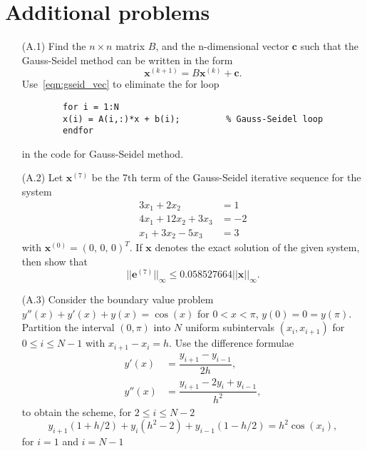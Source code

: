 \documentclass[11pt,a4paper,reqno]{article}
\begin{document}
\section{Additional problems}
\begin{itemize}
	\item[(A.1)] Find the $n \times n$ matrix $B$, and the n-dimensional vector ${\pmb c}$ such that the Gauss-Seidel method can be written in the form
	\begin{equation}
	{\pmb x}^{(k+1)} = B{\pmb x}^{(k)} + {\pmb c}.
	\label{eqn:gseid_vec}
	\end{equation} 
	Use~\eqref{eqn:gseid_vec} to eliminate the for loop 
	\begin{mdframed}[style=cframe,nobreak=true,align=center]
		\begin{verbatim}
		for i = 1:N
		x(i) = A(i,:)*x + b(i);         % Gauss-Seidel loop
		endfor
		\end{verbatim}
	\end{mdframed}
in the code for Gauss-Seidel method.
\item[(A.2)] Let ${\pmb x}^{(7)}$ be the 7$\text{th}$ term of the Gauss-Seidel iterative sequence for the system
\begin{align*}
3x_1 + 2x_2 &= 1\\
4x_1 + 12x_2 + 3x_3 &= -2 \\
x_1 + 3x_2 - 5x_3 &= 3
\end{align*}
with ${\pmb x}^{(0)} = (0,\,0,\,0)^T$. If ${\pmb x}$ denotes the exact solution of the given system, then show that 
\begin{equation}
||{\pmb e}^{(7)}||_{\infty} \leq 0.058527664 ||{\pmb x}||_{\infty}.
\end{equation}
\item[(A.3)] Consider the boundary value problem $y''(x) + y'(x) + y(x) = \cos(x)$ for $0 < x < \pi$, $y(0) = 0 = y(\pi)$. Partition the interval $(0,\pi)$ into $N$ uniform subintervals $(x_{i},x_{i+1})$ for $0 \le i \le N-1$ with $x_{i+1} - x_{i} = h$. Use the difference formulae
\begin{align*}
y'(x) &= \dfrac{y_{i+1} - y_{i-1}}{2h},\\
y''(x) &= \dfrac{y_{i+1} -2y_i + y_{i-1}}{h^2},
\end{align*}
to obtain the scheme, for $2 \le i \le N-2$ 
\begin{equation}
\label{eqn:sys_1}
y_{i+1} (1 + h/2) + y_{i} (h^2 - 2) + y_{i-1} (1 - h/2) = h^2\cos(x_i),
\end{equation}
for $i = 1$ and $i = N-1$

\end{itemize}
\end{document}
